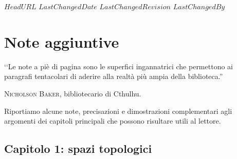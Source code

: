 \svnidlong
{$HeadURL$}
{$LastChangedDate$}
{$LastChangedRevision$}
{$LastChangedBy$}

\chapter{Note aggiuntive}
\begin{introduction}
‘‘Le note a piè di pagina sono le superfici ingannatrici che permettono ai paragrafi tentacolari di aderire alla realtà più ampia della biblioteca.''
\begin{flushright}
	\textsc{Nicholson Baker,} bibliotecario di Cthulhu.
\end{flushright}
\end{introduction}

\noindent Riportiamo alcune note, precisazioni e dimostrazioni complementari agli argomenti dei capitoli principali che possono risultare utili al lettore.
\section{Capitolo 1: spazi topologici}

